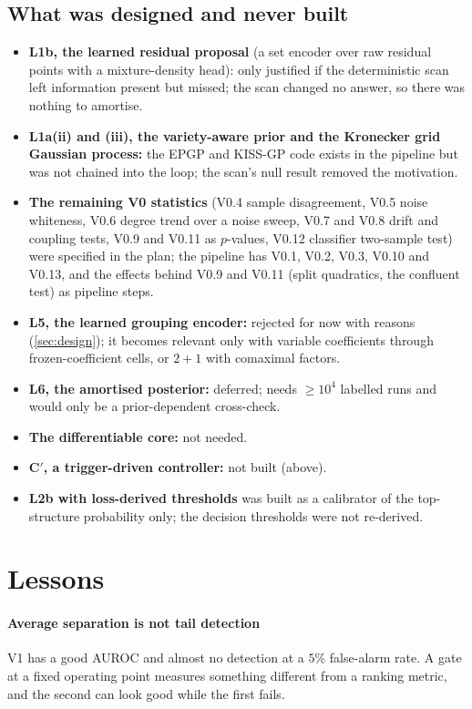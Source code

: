 \documentclass[11pt]{article}
\theoremstyle{plain}
\theoremstyle{definition}
\theoremstyle{remark}
\begin{document}
\subsection{What was designed and never built}\label{sec:unbuilt}
\begin{itemize}
\item \textbf{L1b, the learned residual proposal} (a set encoder over raw residual points with a mixture-density head): only justified if the deterministic scan left information present but missed; the scan changed no answer, so there was nothing to amortise.
\item \textbf{L1a(ii) and (iii), the variety-aware prior and the Kronecker grid Gaussian process:} the EPGP and KISS-GP code exists in the pipeline but was not chained into the loop; the scan's null result removed the motivation.
\item \textbf{The remaining V0 statistics} (V0.4 sample disagreement, V0.5 noise whiteness, V0.6 degree trend over a noise sweep, V0.7 and V0.8 drift and coupling tests, V0.9 and V0.11 as $p$-values, V0.12 classifier two-sample test) were specified in the plan; the pipeline has V0.1, V0.2, V0.3, V0.10 and V0.13, and the effects behind V0.9 and V0.11 (split quadratics, the confluent test) as pipeline steps.
\item \textbf{L5, the learned grouping encoder:} rejected for now with reasons (\cref{sec:design}); it becomes relevant only with variable coefficients through frozen-coefficient cells, or $2{+}1$ with comaximal factors.
\item \textbf{L6, the amortised posterior:} deferred; needs $\ge10^4$ labelled runs and would only be a prior-dependent cross-check.
\item \textbf{The differentiable core:} not needed.
\item \textbf{C$'$, a trigger-driven controller:} not built (above).
\item \textbf{L2b with loss-derived thresholds} was built as a calibrator of the top-structure probability only; the decision thresholds were not re-derived.
\end{itemize}



\section{Lessons}\label{sec:lessons}
\paragraph{Average separation is not tail detection} V1 has a good AUROC and almost no detection at a $5\%$ false-alarm rate. A gate at a fixed operating
point measures something different from a ranking metric, and the second can look good while the first fails.
\end{document}
